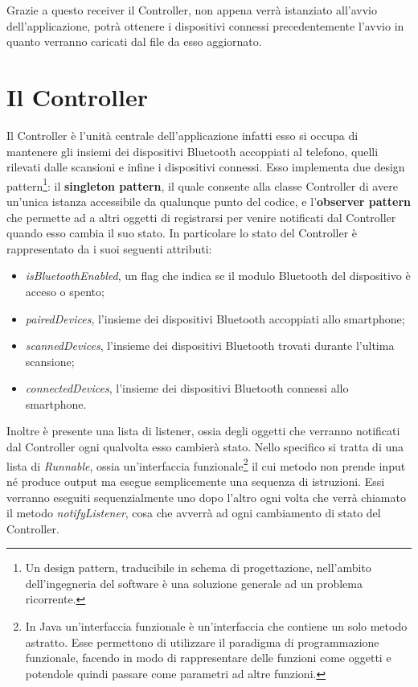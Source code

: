Grazie a questo receiver il Controller, non appena verrà istanziato all'avvio dell'applicazione, potrà ottenere i dispositivi connessi precedentemente l'avvio in quanto verranno caricati dal file da esso aggiornato.

\section{Il Controller} \label{ref:controller}
Il Controller è l'unità centrale dell'applicazione infatti esso si occupa di mantenere gli insiemi dei dispositivi Bluetooth accoppiati al telefono, quelli rilevati dalle scansioni e infine i dispositivi connessi. Esso implementa due design pattern\footnote{Un design pattern, traducibile in schema di progettazione, nell'ambito dell'ingegneria del software è una soluzione generale ad un problema ricorrente.}: il \textbf{singleton pattern}, il quale consente alla classe Controller di avere un'unica istanza accessibile da qualunque punto del codice, e l'\textbf{observer pattern} che permette ad a altri oggetti di registrarsi per venire notificati dal Controller quando esso cambia il suo stato. In particolare lo stato del Controller è rappresentato da i suoi seguenti attributi:
\begin{itemize}
    \item \textit{isBluetoothEnabled}, un flag che indica se il modulo Bluetooth del dispositivo è acceso o spento;
    \item \textit{pairedDevices}, l'insieme dei dispositivi Bluetooth accoppiati allo smartphone;
    \item \textit{scannedDevices}, l'insieme dei dispositivi Bluetooth trovati durante l'ultima scansione;
    \item \textit{connectedDevices}, l'insieme dei dispositivi Bluetooth connessi allo smartphone.
\end{itemize}

Inoltre è presente una lista di listener, ossia degli oggetti che verranno notificati dal Controller ogni qualvolta esso cambierà stato. Nello specifico si tratta di una lista di \textit{Runnable}, ossia un'interfaccia funzionale\footnote{In Java un'interfaccia funzionale è un'interfaccia che contiene un solo metodo astratto. Esse permettono di utilizzare il paradigma di programmazione funzionale, facendo in modo di rappresentare delle funzioni come oggetti e potendole quindi passare come parametri ad altre funzioni.} il cui metodo non prende input né produce output ma esegue semplicemente una sequenza di istruzioni. Essi verranno eseguiti sequenzialmente uno dopo l'altro ogni volta che verrà chiamato il metodo \textit{notifyListener}, cosa che avverrà ad ogni cambiamento di stato del Controller.

